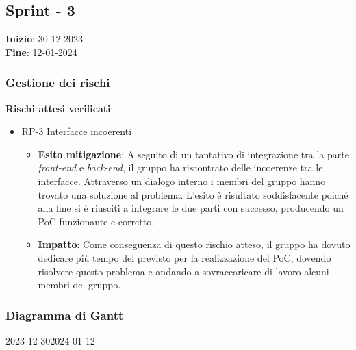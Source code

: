 \subsection{Sprint - 3}
\textbf{Inizio}: 30-12-2023 \\
\textbf{Fine}: 12-01-2024

\subsubsection{Gestione dei rischi}
\textbf{Rischi attesi verificati}:

\begin{itemize}
	\item RP-3 Interfacce incoerenti
	      \begin{itemize}
		      \item \textbf{Esito mitigazione}: A seguito di un tantativo di integrazione tra la parte \textit{front-end} e \textit{back-end}, il gruppo ha riscontrato delle incoerenze tra le interfacce.
		            Attraverso un dialogo interno i membri del gruppo hanno trovato una soluzione al problema. L'esito è risultato soddisfacente poiché alla fine si è riusciti a integrare le due
		            parti con successo, producendo un PoC funzionante e corretto.

		      \item \textbf{Impatto}: Come conseguenza di questo rischio atteso, il gruppo ha dovuto dedicare più tempo del previsto per la realizzazione del PoC, dovendo risolvere
		            questo problema e andando a sovraccaricare di lavoro alcuni membri del gruppo.
	      \end{itemize}
\end{itemize}
\subsubsection{Diagramma di Gantt}

\begin{ganttchart}[
		x unit=0.6cm, %
		y unit chart=0.6cm,
		bar/.style={fill=blue!50},
		bar height=0.5,
		time slot format=isodate,
		time slot unit=day,
		vgrid,
		today=2024-01-8,
		today rule/.style={draw=red, ultra thick}
	]{2023-12-30}{2024-01-12}
	 \\
	 \\
	 \\
	 \\
	 \\
\end{ganttchart}

